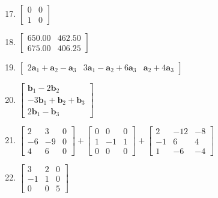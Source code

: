 \documentclass{article}
\newcommand{\va}{\mathbf{a}}
\newcommand{\vb}{\mathbf{b}}
\begin{document}
\begin{enumerate}
	\setcounter{enumi}{16}
	\item $
		      \begin{bmatrix}
			      0 & 0 \\
			      1 & 0
		      \end{bmatrix}$
	      \setcounter{enumi}{18}
	\item $
		      \begin{bmatrix}
			      650.00 & 462.50 \\
			      675.00 & 406.25
		      \end{bmatrix}$
	      \setcounter{enumi}{22}
	\item $
		      \begin{bmatrix}
			      2\va_1+\va_2-\va_3 & 3\va_1-\va_2+6\va_3 & \va_2+4\va_3
		      \end{bmatrix}$
	\item $
		      \begin{bmatrix}
			      \vb_1-2\vb_2        \\
			      -3\vb_1+\vb_2+\vb_3 \\
			      2\vb_1-\vb_3
		      \end{bmatrix}$
	\item $
		      \begin{bmatrix}
			      2  & 3  & 0 \\
			      -6 & -9 & 0 \\
			      4  & 6  & 0
		      \end{bmatrix}
		      +
		      \begin{bmatrix}
			      0 & 0  & 0 \\
			      1 & -1 & 1 \\
			      0 & 0  & 0
		      \end{bmatrix}
		      +
		      \begin{bmatrix}
			      2  & -12 & -8 \\
			      -1 & 6   & 4  \\
			      1  & -6  & -4
		      \end{bmatrix}
	      $
	      \setcounter{enumi}{30}
	\item $
		      \begin{bmatrix}
			      3  & 2 & 0 \\
			      -1 & 1 & 0 \\
			      0  & 0 & 5
		      \end{bmatrix}
	      $
\end{enumerate}
\end{document}
